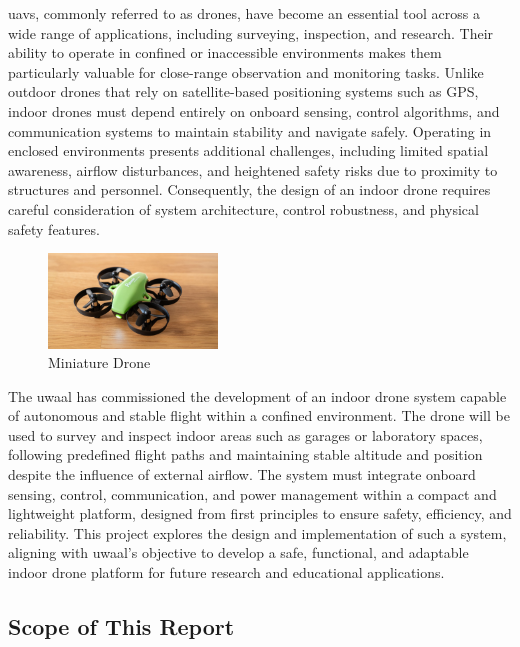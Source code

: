 \glspl{uav}, commonly referred to as drones, have become an essential tool across a wide range of applications, including surveying, inspection, and research. Their ability to operate in confined or inaccessible environments makes them particularly valuable for close-range observation and monitoring tasks. Unlike outdoor drones that rely on satellite-based positioning systems such as GPS, indoor drones must depend entirely on onboard sensing, control algorithms, and communication systems to maintain stability and navigate safely. Operating in enclosed environments presents additional challenges, including limited spatial awareness, airflow disturbances, and heightened safety risks due to proximity to structures and personnel. Consequently, the design of an indoor drone requires careful consideration of system architecture, control robustness, and physical safety features. 

\begin{figure}[H]
    \centering
    \captionsetup{justification=centering, margin=1cm}
    \includegraphics[width=0.4\textwidth]{img/mini-drone.JPG}
    \caption{Miniature Drone \cite{abbott2024}}
\end{figure}

The \gls{uwaal} has commissioned the development of an indoor drone system capable of autonomous and stable flight within a confined environment. The drone will be used to survey and inspect indoor areas such as garages or laboratory spaces, following predefined flight paths and maintaining stable altitude and position despite the influence of external airflow. The system must integrate onboard sensing, control, communication, and power management within a compact and lightweight platform, designed from first principles to ensure safety, efficiency, and reliability. This project explores the design and implementation of such a system, aligning with \gls{uwaal}’s objective to develop a safe, functional, and adaptable indoor drone platform for future research and educational applications. 

\subsection{Scope of This Report}

